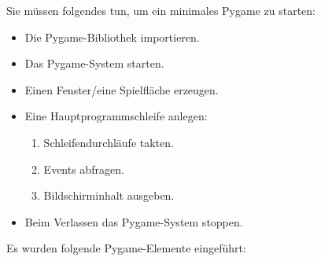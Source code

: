 Sie müssen folgendes tun, um ein minimales Pygame zu starten:
\begin{itemize}
    \item Die Pygame-Bibliothek importieren.
    \item Das Pygame-System starten.
    \item Einen Fenster/eine Spielfläche erzeugen.
    \item Eine Hauptprogrammschleife anlegen:
    \begin{enumerate}
        \item Schleifendurchläufe takten.
        \item Events abfragen.
        \item Bildschirminhalt ausgeben.
    \end{enumerate}
    \item Beim Verlassen das Pygame-System stoppen.
\end{itemize}

Es wurden folgende Pygame-Elemente eingeführt:

